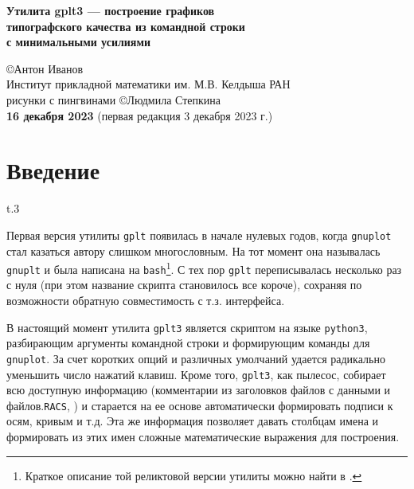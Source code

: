 \documentclass[12pt]{article}
\def\gplt{{\tt gplt}}
\def\gnuplot{{\tt gnuplot}}
\def\python{{\tt python3}}
\def\RACS{{\tt RACS}}
\begin{document}
\begin{center}
 { \Large\bf
Утилита gplt3 --- построение графиков\\ типографского качества из командной строки\\ с минимальными усилиями\\[5mm]
}

\large
\copyright Антон Иванов\\[2mm] 
\normalsize
Институт прикладной математики им. М.В. Келдыша РАН\\[2mm]

\small рисунки с пингвинами \copyright Людмила Степкина\\[3mm]
{\bf 16 декабря 2023} (первая редакция 3 декабря 2023 г.)\\[7mm]

\end{center}

\vspace{-2cm}

\tableofcontents

\newpage
\section{Введение}
\begin{wrapfigure}[5]{t}{.3\textwidth}
  \vphantom{.}
  \vspace{-1.5cm}

\end{wrapfigure}
Первая версия утилиты \gplt{} появилась в начале нулевых годов, когда \gnuplot{} стал казаться автору слишком многословным.
На тот момент она называлась \verb'gnuplt' и была написана на \verb'bash'\footnote{Краткое описание той реликтовой версии утилиты можно найти в \cite{aiv:racs2007}.}.
С тех пор \gplt{} переписывалась несколько раз с нуля (при этом название скрипта становилось все короче),
сохраняя по возможности обратную совместимость с т.з. интерфейса.  

\def\gplt{{\tt gplt3}}

В настоящий момент утилита \gplt{} является скриптом на языке \python, разбирающим аргументы командной строки и формирующим команды для \gnuplot.
За счет коротких опций и различных умолчаний удается радикально уменьшить число нажатий клавиш. Кроме того, \gplt{}, как пылесос, собирает всю доступную информацию
(комментарии из заголовков файлов с данными и файлов.\RACS, \cite{aiwlib:SR:PP2018})
и старается на ее основе автоматически формировать подписи к осям, кривым и т.д.
Эта же информация позволяет давать столбцам имена и формировать из этих имен сложные математические выражения для построения.
\end{document}
